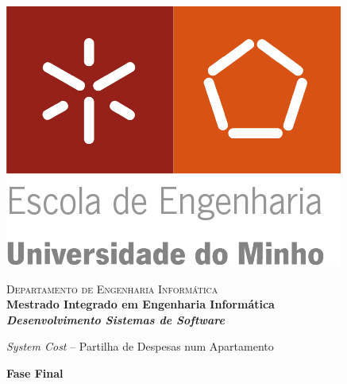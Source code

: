 \begin{titlepage}


\begin{minipage}{0.3\textwidth}
\begin{flushleft} 
\includegraphics[width=\textwidth]{logo}
\end{flushleft}
\end{minipage}
\begin{minipage}{0.6\textwidth}
\begin{flushright} 

\textsc{Departamento de Engenharia Informática}\\[0.1cm]
\bfseries Mestrado Integrado em Engenharia Informática \\ [0.1cm]
\bfseries \textit{Desenvolvimento Sistemas de Software}\\[8mm]

\end{flushright}
\end{minipage}


\vspace{3cm}


\begin{center}


\LARGE \textit{System Cost} – Partilha de Despesas num Apartamento 
\vspace{3ex}


\LARGE \textbf{Fase Final }\\[1.5cm]





\end{center}
\end{titlepage}
